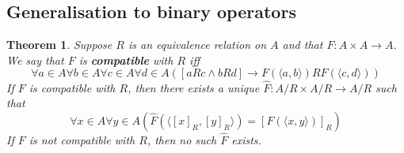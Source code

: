 \documentclass{report}
\newtheorem{theorem}[theo]{Theorem}
\begin{document}
\subsection{Generalisation to binary operators}
\begin{theorem}
Suppose $R$ is an equivalence relation on $A$ and that $F:A\times A\to A$. We say that $F$ is \textbf{compatible} with $R$ iff
\begin{equation*}
\forall a\in A\forall b\in A\forall c\in A\forall d\in A([aRc\land bRd]\to F(\langle a,b\rangle)RF(\langle c,d\rangle))
\end{equation*}
If $F$ is compatible with $R$, then there exists a unique $\hat F:A/R\times A/R\to A/R$ such that
\begin{equation*}
\forall x\in A\forall y\in A(\hat F(\langle[x]_R,[y]_R\rangle)=[F(\langle x,y\rangle)]_R)
\end{equation*}
If $F$ is not compatible with $R$, then no such $\hat F$ exists.
\end{theorem}
\end{document}
